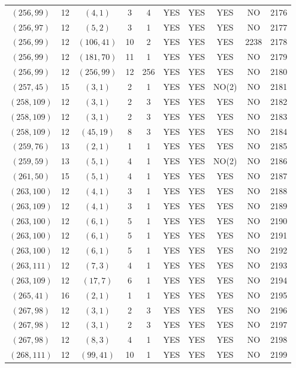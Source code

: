 \begin{longtable}{|c|c|c|c|c|c|c|c|c|c|}
$(256, 99)$ & 12 & $(4, 1)$ & 3 & 4 & YES & YES & YES & NO & 2176\\
$(256, 97)$ & 12 & $(5, 2)$ & 3 & 1 & YES & YES & YES & NO & 2177\\
$(256, 99)$ & 12 & $(106, 41)$ & 10 & 2 & YES & YES & YES & 2238 & 2178\\
$(256, 99)$ & 12 & $(181, 70)$ & 11 & 1 & YES & YES & YES & NO & 2179\\
$(256, 99)$ & 12 & $(256, 99)$ & 12 & 256 & YES & YES & YES & NO & 2180\\
$(257, 45)$ & 15 & $(3, 1)$ & 2 & 1 & YES & YES & NO(2) & NO & 2181\\
$(258, 109)$ & 12 & $(3, 1)$ & 2 & 3 & YES & YES & YES & NO & 2182\\
$(258, 109)$ & 12 & $(3, 1)$ & 2 & 3 & YES & YES & YES & NO & 2183\\
$(258, 109)$ & 12 & $(45, 19)$ & 8 & 3 & YES & YES & YES & NO & 2184\\
$(259, 76)$ & 13 & $(2, 1)$ & 1 & 1 & YES & YES & YES & NO & 2185\\
$(259, 59)$ & 13 & $(5, 1)$ & 4 & 1 & YES & YES & NO(2) & NO & 2186\\
$(261, 50)$ & 15 & $(5, 1)$ & 4 & 1 & YES & YES & YES & NO & 2187\\
$(263, 100)$ & 12 & $(4, 1)$ & 3 & 1 & YES & YES & YES & NO & 2188\\
$(263, 109)$ & 12 & $(4, 1)$ & 3 & 1 & YES & YES & YES & NO & 2189\\
$(263, 100)$ & 12 & $(6, 1)$ & 5 & 1 & YES & YES & YES & NO & 2190\\
$(263, 100)$ & 12 & $(6, 1)$ & 5 & 1 & YES & YES & YES & NO & 2191\\
$(263, 100)$ & 12 & $(6, 1)$ & 5 & 1 & YES & YES & YES & NO & 2192\\
$(263, 111)$ & 12 & $(7, 3)$ & 4 & 1 & YES & YES & YES & NO & 2193\\
$(263, 109)$ & 12 & $(17, 7)$ & 6 & 1 & YES & YES & YES & NO & 2194\\
$(265, 41)$ & 16 & $(2, 1)$ & 1 & 1 & YES & YES & YES & NO & 2195\\
$(267, 98)$ & 12 & $(3, 1)$ & 2 & 3 & YES & YES & YES & NO & 2196\\
$(267, 98)$ & 12 & $(3, 1)$ & 2 & 3 & YES & YES & YES & NO & 2197\\
$(267, 98)$ & 12 & $(8, 3)$ & 4 & 1 & YES & YES & YES & NO & 2198\\
$(268, 111)$ & 12 & $(99, 41)$ & 10 & 1 & YES & YES & YES & NO & 2199\\

\end{longtable}
